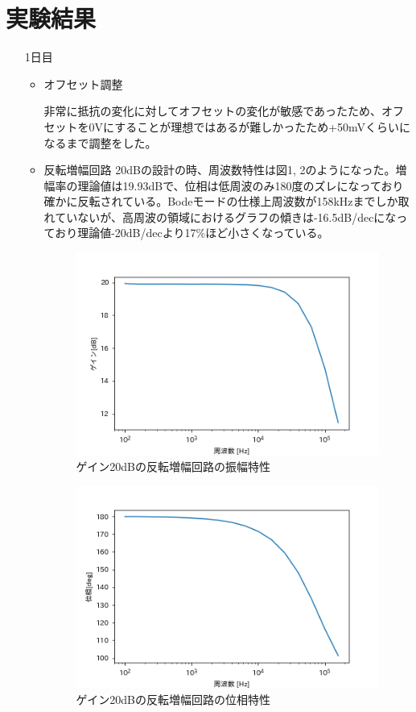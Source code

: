\documentclass[dvipdfmx, twocolumn]{jsarticle}
\begin{document}
\section{実験結果}
\begin{enumerate}

\item[1日目]
\begin{itemize}

\item オフセット調整

非常に抵抗の変化に対してオフセットの変化が敏感であったため、オフセットを0Vにすることが理想ではあるが難しかったため+50mVくらいになるまで調整をした。


\item 反転増幅回路
20dBの設計の時、周波数特性は図1, 2のようになった。増幅率の理論値は19.93dBで、位相は低周波のみ180度のズレになっており確かに反転されている。Bodeモードの仕様上周波数が158kHzまでしか取れていないが、高周波の領域におけるグラフの傾きは-16.5dB/decになっており理論値-20dB/decより17\%ほど小さくなっている。


\begin{figure}[H]
\begin{center}
\includegraphics[scale = 0.5]{G20dB.png}
\caption{ゲイン20dBの反転増幅回路の振幅特性}
\end{center}
\end{figure}

\begin{figure}[H]
\begin{center}
\includegraphics[scale = 0.5]{P20dB.png}
\caption{ゲイン20dBの反転増幅回路の位相特性}
\end{center}
\end{figure}



\end{itemize}
\end{enumerate}
\end{document}
